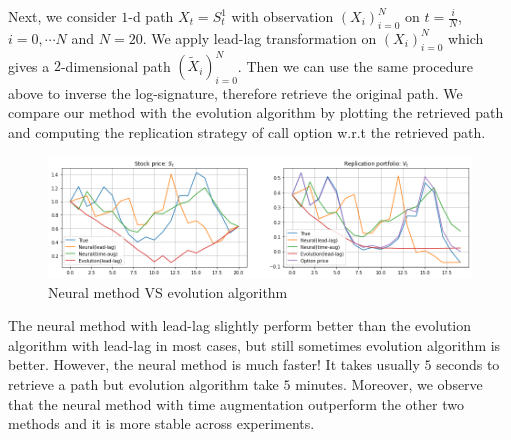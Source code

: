 \documentclass[12pt]{report}
\theoremstyle{definition}
\theoremstyle{remark}
\begin{document}
Next, we consider $1$-d path $X_{t} = S^{1}_{t}$ with observation $(X_{i})_{i=0}^{N}$ on $t = \frac{i}{N}$, $i = 0,\cdots N$ and $N = 20$. We apply lead-lag transformation on $(X_{i})_{i=0}^{N}$ which gives a $2$-dimensional path $(\tilde{X}_{i})_{i=0}^{N}$. Then we can use the same procedure above to inverse the log-signature, therefore retrieve the original path. We compare our method with the evolution algorithm by plotting the retrieved path and computing the replication strategy of call option w.r.t the retrieved path. 
\begin{figure}[H]
  \centering
  \includegraphics[width=\textwidth]{figs/inverse9.png}
  \caption{Neural method VS evolution algorithm}
\end{figure}
The neural method with lead-lag slightly perform better than the evolution algorithm with lead-lag in most cases, but still sometimes evolution algorithm is better. However, the neural method is much faster! It takes usually $5$ seconds to retrieve a path but evolution algorithm take $5$ minutes. Moreover, we observe that the neural method with time augmentation outperform the other two methods and it is more stable across experiments.   
\end{document}
